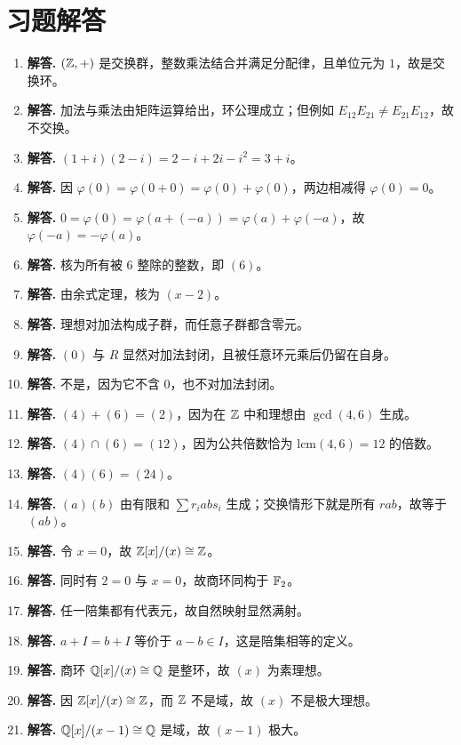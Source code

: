 \section*{习题解答}
\begin{enumerate}[label=\textbf{\arabic*.}, leftmargin=*, itemsep=1em]
\item \textbf{解答.} $(\mathbb{Z},+)$ 是交换群，整数乘法结合并满足分配律，且单位元为 $1$，故是交换环。
\item \textbf{解答.} 加法与乘法由矩阵运算给出，环公理成立；但例如 $E_{12}E_{21}\ne E_{21}E_{12}$，故不交换。
\item \textbf{解答.} $(1+i)(2-i)=2-i+2i-i^2=3+i$。
\item \textbf{解答.} 因 $\varphi(0)=\varphi(0+0)=\varphi(0)+\varphi(0)$，两边相减得 $\varphi(0)=0$。
\item \textbf{解答.} $0=\varphi(0)=\varphi(a+(-a))=\varphi(a)+\varphi(-a)$，故 $\varphi(-a)=-\varphi(a)$。
\item \textbf{解答.} 核为所有被 $6$ 整除的整数，即 $(6)$。
\item \textbf{解答.} 由余式定理，核为 $(x-2)$。
\item \textbf{解答.} 理想对加法构成子群，而任意子群都含零元。
\item \textbf{解答.} $(0)$ 与 $R$ 显然对加法封闭，且被任意环元乘后仍留在自身。
\item \textbf{解答.} 不是，因为它不含 $0$，也不对加法封闭。
\item \textbf{解答.} $(4)+(6)=(2)$，因为在 $\mathbb{Z}$ 中和理想由 $\gcd(4,6)$ 生成。
\item \textbf{解答.} $(4)\cap(6)=(12)$，因为公共倍数恰为 $\mathrm{lcm}(4,6)=12$ 的倍数。
\item \textbf{解答.} $(4)(6)=(24)$。
\item \textbf{解答.} $(a)(b)$ 由有限和 $\sum r_iab s_i$ 生成；交换情形下就是所有 $rab$，故等于 $(ab)$。
\item \textbf{解答.} 令 $x=0$，故 $\mathbb{Z}[x]/(x)\cong \mathbb{Z}$。
\item \textbf{解答.} 同时有 $2=0$ 与 $x=0$，故商环同构于 $\mathbb{F}_2$。
\item \textbf{解答.} 任一陪集都有代表元，故自然映射显然满射。
\item \textbf{解答.} $a+I=b+I$ 等价于 $a-b\in I$，这是陪集相等的定义。
\item \textbf{解答.} 商环 $\mathbb{Q}[x]/(x)\cong \mathbb{Q}$ 是整环，故 $(x)$ 为素理想。
\item \textbf{解答.} 因 $\mathbb{Z}[x]/(x)\cong \mathbb{Z}$，而 $\mathbb{Z}$ 不是域，故 $(x)$ 不是极大理想。
\item \textbf{解答.} $\mathbb{Q}[x]/(x-1)\cong \mathbb{Q}$ 是域，故 $(x-1)$ 极大。

\end{enumerate}
